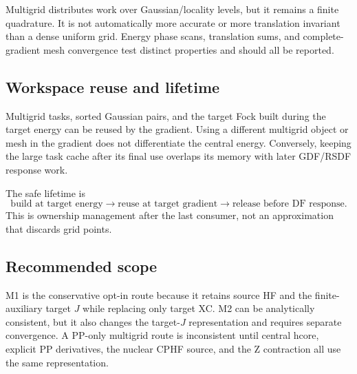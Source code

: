 Multigrid distributes work over Gaussian/locality levels, but it remains a
finite quadrature.  It is not automatically more accurate or more
translation invariant than a dense uniform grid.  Energy phase scans,
translation sums, and complete-gradient mesh convergence test distinct
properties and should all be reported.

\subsection{Workspace reuse and lifetime}

Multigrid tasks, sorted Gaussian pairs, and the target Fock built during the
target energy can be reused by the gradient.  Using a different multigrid
object or mesh in the gradient does not differentiate the central energy.
Conversely, keeping the large task cache after its final use overlaps its
memory with later GDF/RSDF response work.

The safe lifetime is
\begin{equation}
  \text{build at target energy}
  \longrightarrow
  \text{reuse at target gradient}
  \longrightarrow
  \text{release before DF response}.
  \label{eq:target-multigrid-memory}
\end{equation}
This is ownership management after the last consumer, not an approximation
that discards grid points.

\subsection{Recommended scope}

M1 is the conservative opt-in route because it retains source HF and the
finite-auxiliary target $J$ while replacing only target XC.  M2 can be
analytically consistent, but it also changes the target-$J$ representation
and requires separate convergence.  A PP-only multigrid route is inconsistent
until central hcore, explicit PP derivatives, the nuclear CPHF source, and the
Z contraction all use the same representation.
